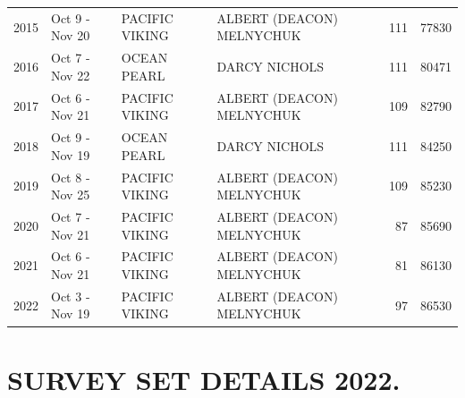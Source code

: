 \documentclass[12pt]{article}\usepackage[]{graphicx}\usepackage[]{color}
\begin{document}
\begin{appendices}
\begin{longtable}{rlllrr}
2015 & Oct  9  - Nov 20 & PACIFIC VIKING & ALBERT (DEACON) MELNYCHUK & 111 & 77830\\
2016 & Oct  7  - Nov 22 & OCEAN PEARL & DARCY NICHOLS & 111 & 80471\\
2017 & Oct  6  - Nov 21 & PACIFIC VIKING & ALBERT (DEACON) MELNYCHUK & 109 & 82790\\
2018 & Oct  9  - Nov 19 & OCEAN PEARL & DARCY NICHOLS & 111 & 84250\\
2019 & Oct  8  - Nov 25 & PACIFIC VIKING & ALBERT (DEACON) MELNYCHUK & 109 & 85230\\
2020 & Oct  7  - Nov 21 & PACIFIC VIKING & ALBERT (DEACON) MELNYCHUK & 87 & 85690\\
2021 & Oct  6  - Nov 21 & PACIFIC VIKING & ALBERT (DEACON) MELNYCHUK & 81 & 86130\\
2022 & Oct  3  - Nov 19 & PACIFIC VIKING & ALBERT (DEACON) MELNYCHUK & 97 & 86530\\
\bottomrule
\end{longtable}
\endgroup{}
\clearpage

\section{SURVEY SET DETAILS 2022.}
\label{app:second-appendix}


\end{appendices}
\end{document}
